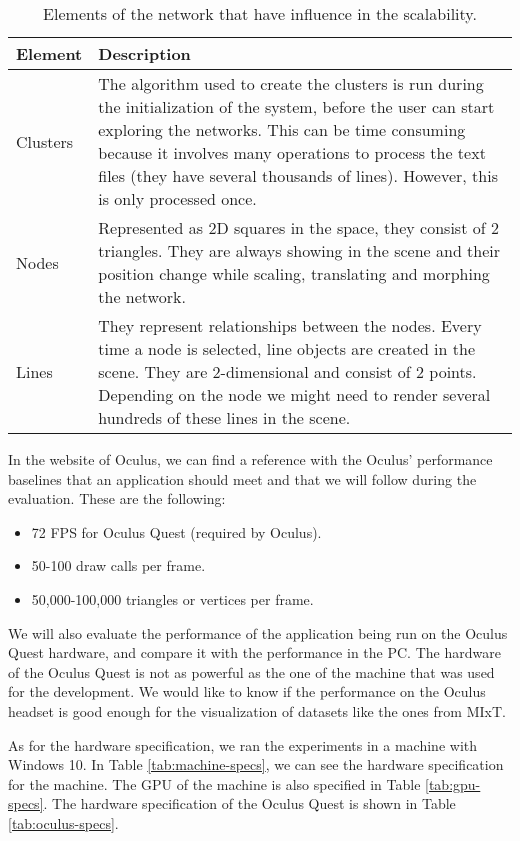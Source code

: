 \begin{table}[h!]
\centering
\begin{tabular}{l p{9cm}}
\hline
Element & Description \\
\hline
Clusters & The algorithm used to create the clusters is run during the initialization of the system, before the user can start exploring the networks. This can be time consuming because it involves many operations to process the text files (they have several thousands of lines). However, this is only processed once. \\
Nodes & Represented as 2D squares in the space, they consist of 2 triangles. They are always showing in the scene and their position change while scaling, translating and morphing the network.  \\
Lines & They represent relationships between the nodes. Every time a node is selected, line objects are created in the scene. They are 2-dimensional and consist of 2 points. Depending on the node we might need to render several hundreds of these lines in the scene. \\
\end{tabular}
\caption{Elements of the network that have influence in the scalability.}
\label{tab:network-elements}
\end{table}

In the website of Oculus, we can find a reference with the Oculus' performance baselines that an application should meet \cite{oculus_performance_baselines} and that we will follow during the evaluation. These are the following:
\begin{itemize}
  \item 72 FPS for Oculus Quest (required by Oculus).
  \item 50-100 draw calls per frame.
  \item 50,000-100,000 triangles or vertices per frame.
\end{itemize}

We will also evaluate the performance of the application being run on the Oculus Quest hardware, and compare it with the performance in the PC. The hardware of the Oculus Quest is not as powerful as the one of the machine that was used for the development. We would like to know if the performance on the Oculus headset is good enough for the visualization of datasets like the ones from MIxT.

As for the hardware specification, we ran the experiments in a machine with Windows 10. In Table \ref{tab:machine-specs}, we can see the hardware specification for the machine. The GPU of the machine is also specified in Table \ref{tab:gpu-specs}. The hardware specification of the Oculus Quest is shown in Table \ref{tab:oculus-specs}.


